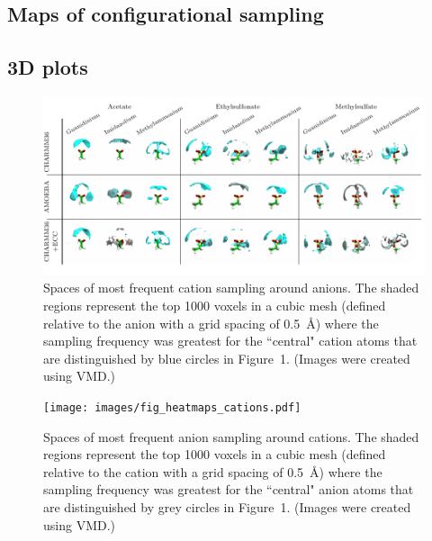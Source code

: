 \documentclass[journal=jacsat,articletitle=true,manuscript=suppinfo,layout=onecolumn]{achemso}
\begin{document}
    
    \begin{landscape}
    \section{Maps of configurational sampling}
    \subsection{3D plots}
    
    \begin{figure}[H]
    \begin{center}
        \includegraphics[width=1.48\textwidth]{images/fig_heatmaps_anions.pdf}
        \caption{Spaces of most frequent cation sampling around anions. The shaded regions represent the top 1000 voxels in a cubic mesh (defined relative to the anion with a grid spacing of 0.5~\AA) where the sampling frequency was greatest for the ``central" cation atoms that are distinguished by blue circles in Figure~1. (Images were created using VMD.\cite{Humphrey1996})}
        \label{fig:3D_anions}
    \end{center}
    \end{figure}
    
    \begin{figure}[H]
    \begin{center}
        \texttt{[image: images/fig\_heatmaps\_cations.pdf]}
        \caption{Spaces of most frequent anion sampling around cations. The shaded regions represent the top 1000 voxels in a cubic mesh (defined relative to the cation with a grid spacing of 0.5~\AA) where the sampling frequency was greatest for the ``central" anion atoms that are distinguished by grey circles in Figure~1. (Images were created using VMD.\cite{Humphrey1996})}
        \label{fig:3D_cations}
    \end{center}
    \end{figure}
    
    \end{landscape}
\end{document}
